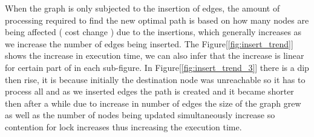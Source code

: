 \documentclass[a4paper]{article}
\begin{document}
When the graph is only subjected to the insertion of edges, the amount of processing required to find the new optimal path is based on how many nodes are being affected ( cost change ) due to the insertions, which generally increases as we increase the number of edges being inserted. The Figure[\ref{fig:insert_trend}] shows the increase in execution time, we can also infer that the increase is linear for certain part of in each sub-figure. In Figure[\ref{fig:insert_trend_3}] there is a dip then rise, it is because initially the destination node was unreachable so it has to process all and as we inserted edges the path is created and it became shorter then after a while due to increase in number of edges the size of the graph grew as well as the number of nodes being updated simultaneously increase so contention for lock increases thus increasing the execution time.
\end{document}

